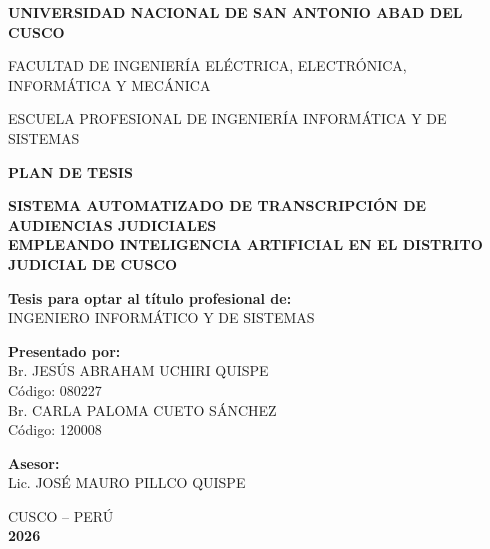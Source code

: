\documentclass[12pt,a4paper,oneside]{report}
\begin{document}
\begin{titlepage}
\centering
\vspace*{0.5cm}

{\large\bfseries UNIVERSIDAD NACIONAL DE SAN ANTONIO ABAD DEL CUSCO\par}
\vspace{0.3cm}
{\normalsize FACULTAD DE INGENIERÍA ELÉCTRICA, ELECTRÓNICA, INFORMÁTICA Y MECÁNICA\par}
\vspace{0.2cm}
{\normalsize ESCUELA PROFESIONAL DE INGENIERÍA INFORMÁTICA Y DE SISTEMAS\par}

\vspace{1cm}


\vspace{0.5cm}

{\large\bfseries PLAN DE TESIS\par}
\vspace{0.8cm}

{\Large\bfseries
SISTEMA AUTOMATIZADO DE TRANSCRIPCIÓN DE AUDIENCIAS JUDICIALES\\
EMPLEANDO INTELIGENCIA ARTIFICIAL EN EL DISTRITO JUDICIAL DE CUSCO
\par}

\vspace{1.5cm}

{\normalsize
\textbf{Tesis para optar al título profesional de:}\\[0.3cm]
INGENIERO INFORMÁTICO Y DE SISTEMAS
\par}

\vspace{1cm}

{\normalsize
\textbf{Presentado por:}\\[0.3cm]
Br. JESÚS ABRAHAM UCHIRI QUISPE\\
Código: 080227\\[0.3cm]
Br. CARLA PALOMA CUETO SÁNCHEZ\\
Código: 120008
\par}

\vspace{1cm}

{\normalsize
\textbf{Asesor:}\\[0.3cm]
Lic. JOSÉ MAURO PILLCO QUISPE
\par}

\vfill

{\normalsize CUSCO -- PERÚ\\[0.2cm] \textbf{2026}}
\end{titlepage}
\end{document}
